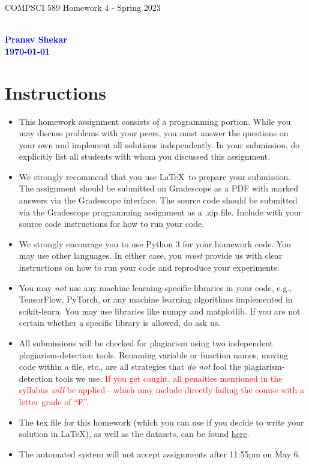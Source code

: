 \documentclass[letterpaper]{article}
\newcommand{\HIGHLIGHT}[1]{\textcolor{blue}{\textbf{#1}}}
\begin{document}
\newpage
\begin{center}
    \begin{Large}
    COMPSCI 589 Homework 4 - Spring 2023
    \end{Large}
    \\
    \HIGHLIGHT{Pranav Shekar}
    \\
    \HIGHLIGHT{\today}
\end{center}



\vspace{0.25in}
\section{Instructions}

\begin{itemize}
    \item This homework assignment consists of a programming portion. While you may discuss problems with your peers, you must answer the questions on your own and implement all solutions independently. In your submission, do explicitly list all students with whom you discussed this assignment. 
    \item We strongly recommend that you use \LaTeX~to prepare your submission. The assignment should be submitted on Gradescope as a PDF with marked answers via the Gradescope interface. The source code should be submitted via the Gradescope programming assignment as a .zip file. Include with your source code instructions for how to run your code. 
    \item We strongly encourage you to use Python 3 for your homework code. You may use other languages. In either case, you \textit{must} provide us with clear instructions on how to run your code and reproduce your experiments. 
    \item You may \textit{not} use any machine learning-specific libraries in your code, e.g., TensorFlow, PyTorch, or any machine learning algorithms implemented in scikit-learn. You may use libraries like numpy and matplotlib. If you are not certain whether a specific library is allowed, do ask us.
    \item All submissions will be checked for plagiarism using two independent plagiarism-detection tools. Renaming variable or function names, moving code within a file, etc., are all strategies that \textit{do not} fool the plagiarism-detection tools we use. \textcolor{red}{If you get caught, all penalties mentioned in the syllabus \textit{will} be applied---which may include directly failing the course with a letter grade of ``F''}.
    \item The tex file for this homework (which you can use if you decide to write your solution in \LaTeX), as well as the datasets, can be found \href{https://people.cs.umass.edu/~bsilva/courses/CMPSCI_589/Spring2023/homeworks/hw4.zip}{here}.
    \item The automated system will not accept assignments after 11:55pm on May 6. 
\end{itemize}
\end{document}

